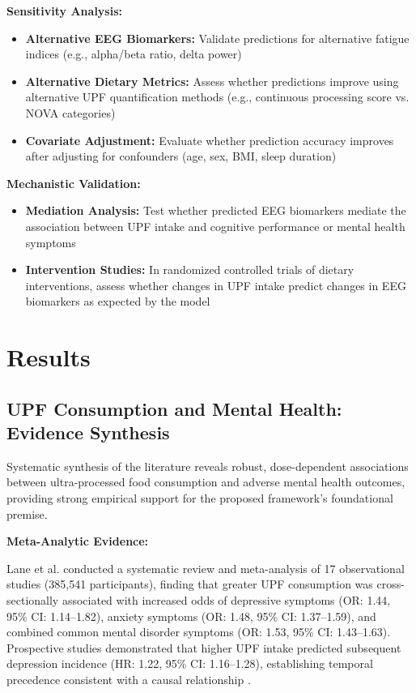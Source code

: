 \documentclass[journal,twoside,10pt]{IEEEtran}
\begin{document}
\textbf{Sensitivity Analysis:}
\begin{itemize}
\item \textbf{Alternative EEG Biomarkers:} Validate predictions for alternative fatigue indices (e.g., alpha/beta ratio, delta power)
\item \textbf{Alternative Dietary Metrics:} Assess whether predictions improve using alternative UPF quantification methods (e.g., continuous processing score vs. NOVA categories)
\item \textbf{Covariate Adjustment:} Evaluate whether prediction accuracy improves after adjusting for confounders (age, sex, BMI, sleep duration)
\end{itemize}

\textbf{Mechanistic Validation:}
\begin{itemize}
\item \textbf{Mediation Analysis:} Test whether predicted EEG biomarkers mediate the association between UPF intake and cognitive performance or mental health symptoms
\item \textbf{Intervention Studies:} In randomized controlled trials of dietary interventions, assess whether changes in UPF intake predict changes in EEG biomarkers as expected by the model
\end{itemize}



\section{Results}

\subsection{UPF Consumption and Mental Health: Evidence Synthesis}

Systematic synthesis of the literature reveals robust, dose-dependent associations between ultra-processed food consumption and adverse mental health outcomes, providing strong empirical support for the proposed framework's foundational premise.

\textbf{Meta-Analytic Evidence:}

Lane et al. \cite{ref21} conducted a systematic review and meta-analysis of 17 observational studies (385,541 participants), finding that greater UPF consumption was cross-sectionally associated with increased odds of depressive symptoms (OR: 1.44, 95\% CI: 1.14--1.82), anxiety symptoms (OR: 1.48, 95\% CI: 1.37--1.59), and combined common mental disorder symptoms (OR: 1.53, 95\% CI: 1.43--1.63). Prospective studies demonstrated that higher UPF intake predicted subsequent depression incidence (HR: 1.22, 95\% CI: 1.16--1.28), establishing temporal precedence consistent with a causal relationship \cite{ref21}.
\end{document}
